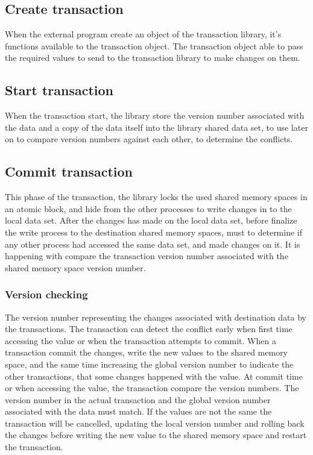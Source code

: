 \documentclass[12pt]{article}
\begin{document}
\subsection{Create transaction}
When the external program create an object of the transaction library, it's functions available to the transaction object. The transaction object able to pass the required values to send to the transaction library to make changes on them.

\subsection{Start transaction}
When the transaction start, the library store the version number associated with the data and a copy of the data itself into the library shared data set, to use later on to compare version numbers against each other, to determine the conflicts.

\subsection{Commit transaction}
This phase of the transaction, the library locks the used shared memory spaces in an atomic block, and hide from the other processes to write changes in to the local data set. After the changes has made on the local data set, before finalize the write process to the destination shared memory spaces, must to determine if any other process had accessed the same data set, and made changes on it. It is happening with compare the transaction version number associated with the shared memory space version number. 

\subsubsection{Version checking}
The version number representing the changes associated with destination data by the transactions. The transaction can detect the conflict early when first time accessing the value or when the transaction attempts to commit. When a transaction commit the changes, write the new values to the shared memory space, and the same time increasing the global version number to indicate the other transactions, that some changes happened with the value. At commit time or when accessing the value, the transaction compare the version numbers. The version number in the actual transaction and the global version number associated with the data must match. If the values are not the same the transaction will be cancelled, updating the local version number and rolling back the changes before writing the new value to the shared memory space and restart the transaction.
\end{document}
